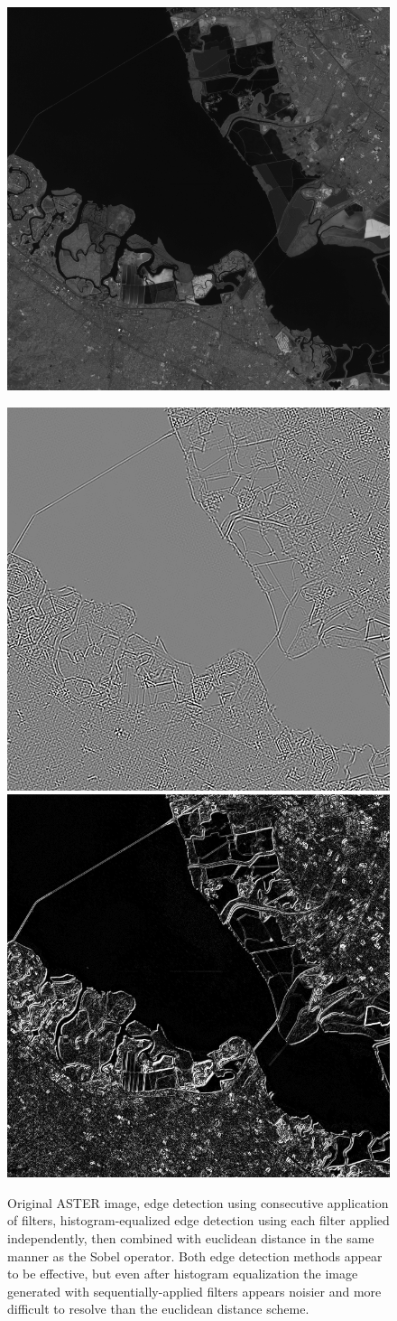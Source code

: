\documentclass[12pt]{article}
\begin{document}
\begin{figure}[h!]
    \centering
    \includegraphics[width=.6\linewidth]{figures/p8/aster_original.png}

    \vspace{.2em}
    \includegraphics[width=.48\linewidth]{figures/p8/aster_sequential.png}
    \includegraphics[width=.48\linewidth]{figures/p8/aster_multi.png}

    \caption{Original ASTER image, edge detection using consecutive application of filters, histogram-equalized edge detection using each filter applied independently, then combined with euclidean distance in the same manner as the Sobel operator. Both edge detection methods appear to be effective, but even after histogram equalization the image generated with sequentially-applied filters appears noisier and more difficult to resolve than the euclidean distance scheme.}
    \label{p8_edgeresults}
\end{figure}
\end{document}
